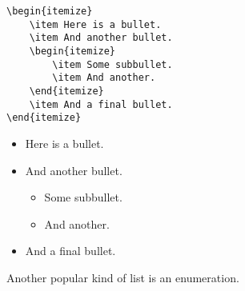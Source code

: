 \documentclass[letterpaper,twoside,10pt]{article}
\begin{document}
\begin{multicols}{2}
{\begin{verbatim}
\begin{itemize}
    \item Here is a bullet.
    \item And another bullet.
    \begin{itemize}
        \item Some subbullet.
        \item And another.
    \end{itemize}
    \item And a final bullet.
\end{itemize}
\end{verbatim}}
\begin{itemize}
    \item Here is a bullet.
    \item And another bullet.
    \begin{itemize}
        \item Some subbullet.
        \item And another.
    \end{itemize}
    \item And a final bullet.
\end{itemize}
\end{multicols}

Another popular kind of list is an enumeration.
\end{document}
